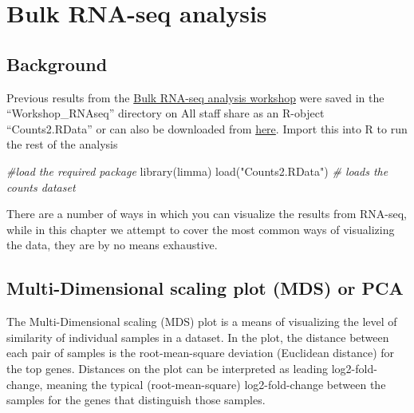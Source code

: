 \documentclass[
  openany]{book}
\newenvironment{Shaded}{\begin{snugshade}}{\end{snugshade}}
\newcommand{\AttributeTok}[1]{\textcolor[rgb]{0.77,0.63,0.00}{#1}}
\newcommand{\CommentTok}[1]{\textcolor[rgb]{0.56,0.35,0.01}{\textit{#1}}}
\newcommand{\FloatTok}[1]{\textcolor[rgb]{0.00,0.00,0.81}{#1}}
\newcommand{\FunctionTok}[1]{\textcolor[rgb]{0.00,0.00,0.00}{#1}}
\newcommand{\NormalTok}[1]{#1}
\newcommand{\OtherTok}[1]{\textcolor[rgb]{0.56,0.35,0.01}{#1}}
\newcommand{\SpecialCharTok}[1]{\textcolor[rgb]{0.00,0.00,0.00}{#1}}
\newcommand{\StringTok}[1]{\textcolor[rgb]{0.31,0.60,0.02}{#1}}
\begin{document}
\vspace{-100pt}

\hypertarget{bulk-rna-seq-analysis}{%
\chapter{Bulk RNA-seq analysis}\label{bulk-rna-seq-analysis}}

\hypertarget{background}{%
\section{Background}\label{background}}

Previous results from the \href{https://chisangad.github.io/bulkRNAseqtut/index.html}{Bulk RNA-seq analysis workshop} were saved in the ``Workshop\_RNAseq'' directory on All staff share as an R-object ``Counts2.RData'' or can also be downloaded from \href{}{here}. Import this into R to run the rest of the analysis

\begin{Shaded}
\begin{Highlighting}[]
\CommentTok{\#load the required package}
\FunctionTok{library}\NormalTok{(limma)}
\FunctionTok{load}\NormalTok{(}\StringTok{"Counts2.RData"}\NormalTok{) }\CommentTok{\# loads the counts dataset}
\end{Highlighting}
\end{Shaded}

There are a number of ways in which you can visualize the results from RNA-seq, while in this chapter we attempt to cover the most common ways of visualizing the data, they are by no means exhaustive.

\hypertarget{multi-dimensional-scaling-plot-mds-or-pca}{%
\section{Multi-Dimensional scaling plot (MDS) or PCA}\label{multi-dimensional-scaling-plot-mds-or-pca}}

The Multi-Dimensional scaling (MDS) plot is a means of visualizing the level of similarity of individual samples in a dataset. In the plot, the distance between each pair of samples is the root-mean-square deviation (Euclidean distance) for the top genes. Distances on the plot can be interpreted as leading log2-fold-change, meaning the typical (root-mean-square) log2-fold-change between the samples for the genes that distinguish those samples.

\begin{Shaded}
\end{Shaded}
\end{document}
